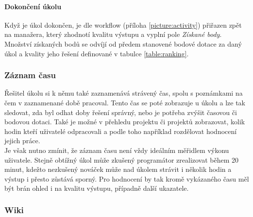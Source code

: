 \paragraph{Dokončení úkolu}

Když je úkol dokončen, je dle workflow (příloha \ref{picture:activity}) přiřazen zpět na manažera, který zhodnotí kvalitu výstupu a vyplní pole \emph{Získané body}. Množství získaných bodů se odvíjí od předem stanovené bodové dotace za daný úkol a kvality jeho řešení definované v tabulce \ref{table:ranking}. 

\subsubsection{Záznam času} \label{redmine:time}

Řešitel úkolu si k němu také zaznamenává strávený čas, spolu s poznámkami na čem v zaznamenané době pracoval. Tento čas se poté zobrazuje u úkolu a lze tak sledovat, zda byl odhat doby řešení správný, nebo je potřeba zvýšit časovou či bodovou dotaci. Také je možné v přehledu projektu či projektů zobrazovat, kolik hodin kteří uživatelé odpracovali a podle toho například rozdělovat hodnocení jejich práce.\\
Je však nutno zmínit, že záznam času není vždy ideálním měřidlem výkonu uživatele. Stejně obtížný úkol může zkušený programátor zrealizovat během 20 minut, kdežto nezkušený nováček může nad úkolem strávit i několik hodin a výstup i přesto zůstává sporný. Pro hodnocení by tak kromě vykázaného času měl být brán ohled i na kvalitu výstupu, případně další ukazatele.

\subsubsection{Wiki}

